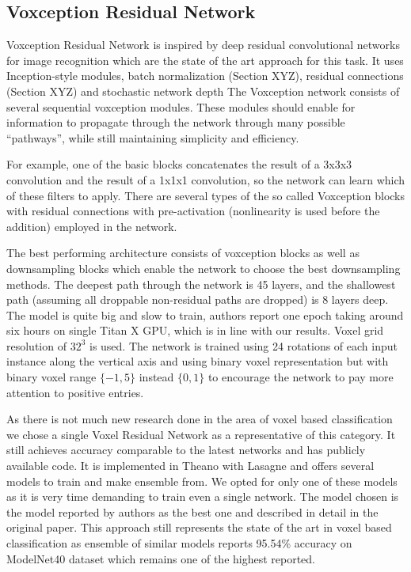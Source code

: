 \subsection{Voxception Residual Network}
Voxception Residual Network \cite{brock_generative_2016} is inspired by deep residual convolutional networks for image recognition which are the state of the art approach for this task. It uses Inception-style \cite{szegedy_inception-v4_2016} modules, batch normalization (Section XYZ), residual connections (Section XYZ) and stochastic network depth \cite{huang_deep_2016} The Voxception network consists of several sequential voxception modules. These modules  should enable for information to propagate through the network through many possible “pathways”, while still maintaining simplicity and efficiency. \par
For example, one of the basic blocks concatenates the result of a 3x3x3 convolution and the result of a 1x1x1 convolution, so the network can learn which of these filters to apply. There are several types of the so called Voxception blocks with residual connections with pre-activation (nonlinearity is used before the addition) employed in the network. \par
The best performing architecture consists of voxception blocks as well as downsampling blocks which enable the network to choose the best downsampling methods. The deepest path through the network is 45 layers, and the shallowest path (assuming all droppable non-residual paths are dropped) is 8 layers deep.
The model is quite big and slow to train, authors report one epoch taking around six hours on single Titan X GPU, which is in line with our results.
Voxel grid resolution of $32^3$ is used. The network is trained using 24 rotations of each input instance along the vertical axis and using binary voxel representation but with binary voxel range $\{-1,5\}$ instead $\{0,1\}$  to encourage the network to pay more attention to positive entries. \par
As there is not much new research done in the area of voxel based classification we chose a single Voxel Residual Network as a representative of this category. It still achieves accuracy comparable to the latest networks and has publicly available code. It is implemented in Theano with Lasagne and offers several models to train and make ensemble from. We opted for only one of these models as it is very time demanding to train even a single network. The model chosen is the model reported by authors as the best one and described in detail in the original paper. 
This approach still represents the state of the art in voxel based classification as ensemble of similar models reports 95.54\% accuracy on ModelNet40 dataset which remains one of the highest reported.

